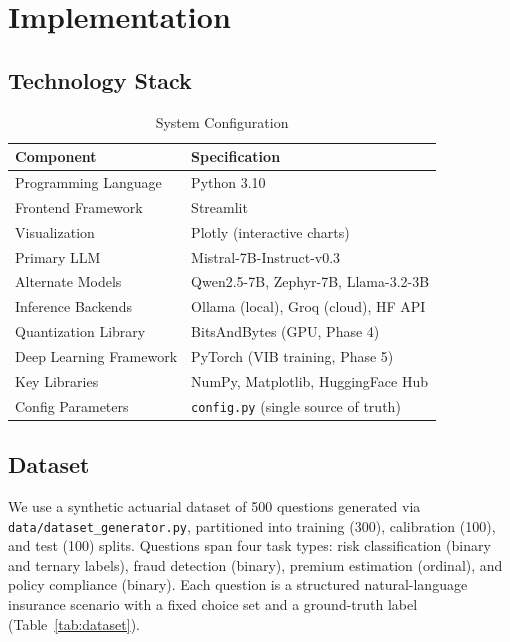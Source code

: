 \documentclass[conference]{IEEEtran}
\begin{document}
\section{Implementation}
\label{sec:impl}

\subsection{Technology Stack}

\begin{table}[htbp]
\centering
\caption{System Configuration}
\label{tab:config}
\renewcommand{\arraystretch}{1.1}
\begin{tabular}{ll}
\toprule
\textbf{Component}           & \textbf{Specification} \\
\midrule
Programming Language         & Python 3.10 \\
Frontend Framework           & Streamlit \\
Visualization                & Plotly (interactive charts) \\
Primary LLM                  & Mistral-7B-Instruct-v0.3 \\
Alternate Models             & Qwen2.5-7B, Zephyr-7B, Llama-3.2-3B \\
Inference Backends           & Ollama (local), Groq (cloud), HF API \\
Quantization Library         & BitsAndBytes (GPU, Phase 4) \\
Deep Learning Framework      & PyTorch (VIB training, Phase 5) \\
Key Libraries                & NumPy, Matplotlib, HuggingFace Hub \\
Config Parameters            & \texttt{config.py} (single source of truth) \\
\bottomrule
\end{tabular}
\end{table}

\subsection{Dataset}

We use a synthetic actuarial dataset of 500 questions generated via
\texttt{data/dataset\_generator.py}, partitioned into training (300),
calibration (100), and test (100) splits. Questions span four task
types: risk classification (binary and ternary labels), fraud
detection (binary), premium estimation (ordinal), and policy
compliance (binary). Each question is a structured natural-language
insurance scenario with a fixed choice set and a ground-truth label
(Table~\ref{tab:dataset}).
\end{document}
